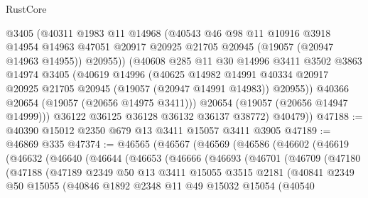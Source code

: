 \begin{lexlean}{RustCore}
\begin{coremodule}
            @3405
            (@40311
              @1983
              @11
              @14968
              (@40543
                @46
                @98
                @11
                @10916
                @3918
                @14954
                @14963
                @47051
                @20917
                @20925
                @21705
                @20945
                (@19057 (@20947 @14963 @14955))
                @20955))
            (@40608
              @285
              @11
              @30
              @14996
              @3411
              @3502
              @3863
              @14974
              @3405
              (@40619
                @14996
                (@40625
                  @14982
                  @14991
                  @40334
                  @20917
                  @20925
                  @21705
                  @20945
                  (@19057 (@20947 @14991 @14983))
                  @20955))
              @40366
              @20654
              (@19057 (@20656 @14975 @3411)))
            @20654
            (@19057 (@20656 @14947 @14999)))
          @36122
          @36125
          @36128
          @36132
          @36137
          @38772)
        @40479))
@47188 := @40390 @15012 @2350 @679 @13 @3411 @15057 @3411 @3905
@47189 := @46869 @335
@47374 := @46565
    (@46567
      (@46569
        (@46586
          (@46602
            (@46619
              (@46632
                (@46640
                  (@46644
                    (@46653
                      (@46666
                        (@46693
                          (@46701
                            (@46709
                              (@47180
                                (@47188
                                  (@47189
                                    @2349
                                    @50
                                    @13
                                    @3411
                                    @15055
                                    @3515
                                    @2181
                                    (@40841
                                      @2349
                                      @50
                                      @15055
                                      (@40846
                                        @1892
                                        @2348
                                        @11
                                        @49
                                        @15032
                                        @15054
                                        (@40540

\end{coremodule}
\end{lexlean}
